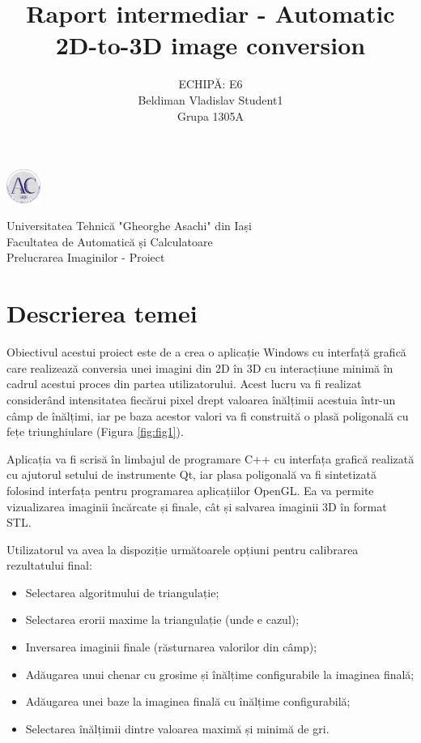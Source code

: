 \documentclass[12pt]{article}
\title{\textbf{Raport intermediar - Automatic 2D-to-3D image conversion}}
\author{
 	ECHIPĂ: E6
	\\
	 Beldiman Vladislav Student1
	\\
	Grupa 1305A
}
\begin{document}
\noindent\begin{minipage}{0.1\textwidth}
	\includegraphics[width=1.1cm]{logo_AC.png}
\end{minipage}
\hfill
\begin{minipage}{1\textwidth}\raggedright
	Universitatea Tehnică "Gheorghe Asachi" din Iași\\
	Facultatea de Automatică și Calculatoare\\
	Prelucrarea Imaginilor - Proiect
\end{minipage}

\vspace{5cm}
{\let\newpage\relax\maketitle}
\newpage

\section{Descrierea temei}

Obiectivul acestui proiect este de a crea o aplicație Windows cu interfață grafică care realizează conversia unei imagini din 2D în 3D cu interacțiune minimă în cadrul acestui proces din partea utilizatorului. Acest lucru va fi realizat considerând intensitatea fiecărui pixel drept valoarea înălțimii acestuia într-un câmp de înălțimi, iar pe baza acestor valori va fi construită o plasă poligonală cu fețe triunghiulare (Figura \ref{fig:fig1}).

Aplicația va fi scrisă în limbajul de programare C++ cu interfața grafică realizată cu ajutorul setului de instrumente Qt, iar plasa poligonală va fi sintetizată folosind interfața pentru programarea aplicațiilor OpenGL. Ea va permite vizualizarea imaginii încărcate și finale, cât și salvarea imaginii 3D în format STL.

Utilizatorul va avea la dispoziție următoarele opțiuni pentru calibrarea rezultatului final:
\begin{itemize}
	\item Selectarea algoritmului de triangulație;
	\item Selectarea erorii maxime la triangulație (unde e cazul);
	\item Inversarea imaginii finale (răsturnarea valorilor din câmp);
	\item Adăugarea unui chenar cu grosime și înălțime configurabile la imaginea finală;
	\item Adăugarea unei baze la imaginea finală cu înălțime configurabilă;
	\item Selectarea înălțimii dintre valoarea maximă și minimă de gri.
\end{itemize}
\end{document}
